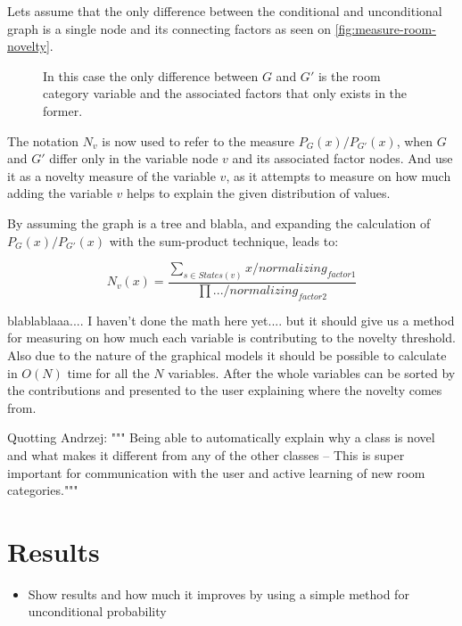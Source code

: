\documentclass[runningheads,a4paper]{llncs}
\begin{document}
Lets assume that the only difference between the conditional and unconditional graph is a single node and its connecting factors
as seen on \autoref{fig:measure-room-novelty}.

\begin{figure}[h]
\hfill
{}

\caption{\label{fig:measure-room-novelty}In this case the only difference between $G$ and $G'$ is the room category variable
         and the associated factors that only exists in the former.}
\end{figure}

The notation $N_v$ is now used to refer to the measure $P_G(x)/P_{G'}(x)$, when $G$ and $G'$ differ only in the variable node $v$ and
its associated factor nodes.
And use it as a novelty measure of the variable $v$, as it attempts to measure on how much adding the variable $v$ helps to explain the
given distribution of values.

By assuming the graph is a tree and blabla, and expanding the calculation of $P_G(x)/P_{G'}(x)$ with the sum-product technique, leads to:

\begin{equation}
N_v(x) = \frac{\sum_{s \in States(v)}x / normalizing_{factor1}}{\prod{...} / normalizing_{factor2}}
\end{equation}

blablablaaa....
I haven't done the math here yet.... but it should give us a method for measuring on how much each variable is contributing to the novelty
threshold.
Also due to the nature of the graphical models it should be possible to calculate in $O(N)$ time for all the $N$ variables.
After the whole variables can be sorted by the contributions and presented to the user explaining where the novelty comes from.

Quotting Andrzej: """ Being able to automatically explain why a class is novel and what
makes it different from any of the other classes -- This is super important for communication with the user and active learning of new room categories."""

\section{Results}
\begin{itemize}
\item Show results and how much it improves by using a simple method for unconditional probability
\end{itemize}
\end{document}
